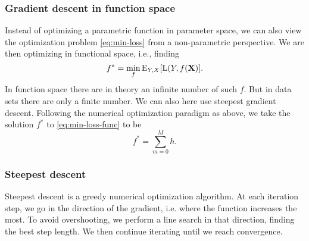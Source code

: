 \subsubsection*{Gradient descent in function space}
Instead of optimizing a parametric function in parameter space, we can also view the optimization problem \eqref{eq:min-loss} from a non-parametric perspective. We are then optimizing in functional space, i.e., finding
\begin{equation}\label{eq:min-loss-func}
    f^*=\underset{f}{\min}\operatorname{E}_{Y,X}[\operatorname{L}(Y,f(\mathbf{X})].
\end{equation}
In function space there are in theory an infinite number of such $f$. But in data sets there are only a finite number. We can also here use steepest gradient descent. Following the numerical optimization paradigm as above, we take the solution $f^*$ to \eqref{eq:min-loss-func} to be
\begin{equation}
    f^*=\sum_{m=0}^Mh.
\end{equation}

\subsubsection{Steepest descent}
Steepest descent is a greedy numerical optimization algorithm. At each iteration step, we go in the direction of the gradient, i.e. where the function increases the most. To avoid overshooting, we perform a line search in that direction, finding the best step length. We then continue iterating until we reach convergence.